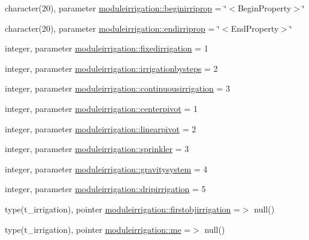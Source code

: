 \begin{DoxyCompactItemize}
\item 
character(20), parameter \mbox{\hyperlink{namespacemoduleirrigation_a7b9cd689d449001080ee8306937e548b}{moduleirrigation\+::beginirriprop}} = \char`\"{}$<$Begin\+Property$>$\char`\"{}
\item 
character(20), parameter \mbox{\hyperlink{namespacemoduleirrigation_a65b1bc6c0161df8127aa3f2e0700aa0f}{moduleirrigation\+::endirriprop}} = \char`\"{}$<$End\+Property$>$\char`\"{}
\item 
integer, parameter \mbox{\hyperlink{namespacemoduleirrigation_af18536531d1a60d197cbd139c29b6a23}{moduleirrigation\+::fixedirrigation}} = 1
\item 
integer, parameter \mbox{\hyperlink{namespacemoduleirrigation_a6f420362ee468739eb03ec59c6122a8b}{moduleirrigation\+::irrigationbysteps}} = 2
\item 
integer, parameter \mbox{\hyperlink{namespacemoduleirrigation_a3f1f1153accbe98bce266d510f0f4040}{moduleirrigation\+::continuousirrigation}} = 3
\item 
integer, parameter \mbox{\hyperlink{namespacemoduleirrigation_add295bc7a511d04311da8b9a1a8c7d86}{moduleirrigation\+::centerpivot}} = 1
\item 
integer, parameter \mbox{\hyperlink{namespacemoduleirrigation_a932e0690fe4a0a49e49dc227e2125ce8}{moduleirrigation\+::linearpivot}} = 2
\item 
integer, parameter \mbox{\hyperlink{namespacemoduleirrigation_acd46c6a54f736c193beab3bdd802c697}{moduleirrigation\+::sprinkler}} = 3
\item 
integer, parameter \mbox{\hyperlink{namespacemoduleirrigation_acd6586cdd0a8288da599088d54558cc5}{moduleirrigation\+::gravitysystem}} = 4
\item 
integer, parameter \mbox{\hyperlink{namespacemoduleirrigation_af19cd97530363d4eae8f7dee720ca806}{moduleirrigation\+::dripirrigation}} = 5
\item 
type(t\+\_\+irrigation), pointer \mbox{\hyperlink{namespacemoduleirrigation_a75d41f9a105660aa75946ab5de6c746c}{moduleirrigation\+::firstobjirrigation}} =$>$ null()
\item 
type(t\+\_\+irrigation), pointer \mbox{\hyperlink{namespacemoduleirrigation_a82eeda1d7ba69cfca539fcb735102ccf}{moduleirrigation\+::me}} =$>$ null()
\end{DoxyCompactItemize}
